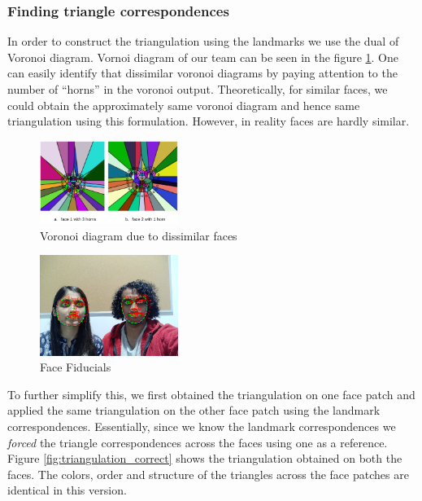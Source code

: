 \documentclass[conference]{IEEEtran}
\begin{document}
\subsubsection{Finding triangle correspondences}
In order to construct the triangulation using the landmarks we use the dual of Voronoi diagram. Vornoi diagram of our team can be seen in the figure \ref{fig:voronoi_test}. One can easily identify that dissimilar voronoi diagrams by paying attention to the number of ``horns'' in the voronoi output. Theoretically, for similar faces, we could obtain the approximately same voronoi diagram and hence same triangulation using this formulation. However, in reality faces are hardly similar. 


\begin{figure}[]
    \centering
    \includegraphics[width=0.4\textwidth]{media/voronoi_merge.png}
    \caption{Voronoi diagram due to dissimilar faces}
    \label{fig:voronoi_test}
\end{figure}



\begin{figure}[!htbp]
\centering
\includegraphics[width=0.4\textwidth]{media/landmarks.png}
\caption{Face Fiducials}
\label{fig:dlib_landmarks}
\end{figure}

To further simplify this, we first obtained the triangulation on one face patch and applied the same triangulation on the other face patch using the landmark correspondences. Essentially, since we know the landmark correspondences we \textit{forced} the triangle correspondences across the faces using one as a reference. Figure \ref{fig:triangulation_correct} shows the triangulation obtained on both the faces. The colors, order and structure of the triangles across the face patches are identical in this version. 
\end{document}
